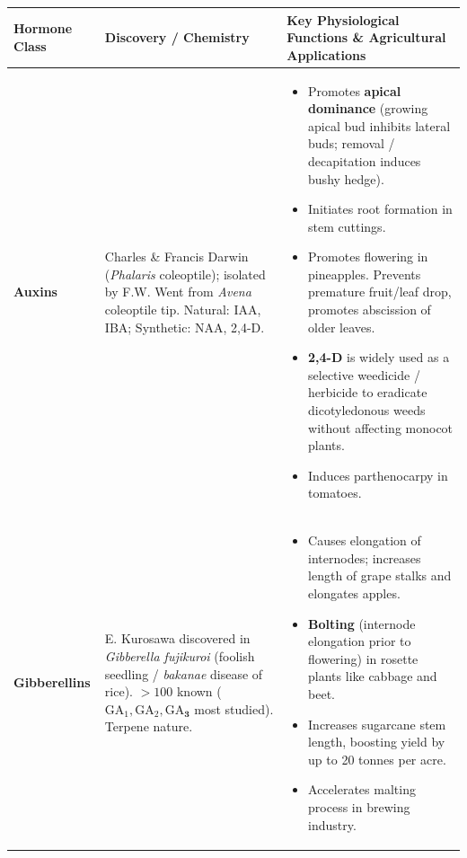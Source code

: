 \documentclass[10pt,a4paper]{article}
\begin{document}
\begin{conceptbox}
\begin{center}
\scriptsize
\begin{tabular}{|p{1.8cm}|p{2.6cm}|p{9.4cm}|}
\hline
\textbf{Hormone Class} & \textbf{Discovery / Chemistry} & \textbf{Key Physiological Functions \& Agricultural Applications} \\
\hline
\textbf{Auxins} & Charles \& Francis Darwin (\textit{Phalaris} coleoptile); isolated by F.W. Went from \textit{Avena} coleoptile tip. Natural: IAA, IBA; Synthetic: NAA, 2,4-D. & \begin{minipage}[t]{9.4cm}\begin{itemize}[leftmargin=*,nosep] \item Promotes \textbf{apical dominance} (growing apical bud inhibits lateral buds; removal / decapitation induces bushy hedge). \item Initiates root formation in stem cuttings. \item Promotes flowering in pineapples. Prevents premature fruit/leaf drop, promotes abscission of older leaves. \item \textbf{2,4-D} is widely used as a selective weedicide / herbicide to eradicate dicotyledonous weeds without affecting monocot plants. \item Induces parthenocarpy in tomatoes. \end{itemize}\end{minipage} \\
\hline
\textbf{Gibberellins} & E. Kurosawa discovered in \textit{Gibberella fujikuroi} (foolish seedling / \textit{bakanae} disease of rice). $>100$ known ($\mathrm{GA}_1, \mathrm{GA}_2, \mathbf{\mathrm{GA}_3}$ most studied). Terpene nature. & \begin{minipage}[t]{9.4cm}\begin{itemize}[leftmargin=*,nosep] \item Causes elongation of internodes; increases length of grape stalks and elongates apples. \item \textbf{Bolting} (internode elongation prior to flowering) in rosette plants like cabbage and beet. \item Increases sugarcane stem length, boosting yield by up to 20 tonnes per acre. \item Accelerates malting process in brewing industry. \end{itemize}\end{minipage} \\

\end{tabular}
\end{center}
\end{conceptbox}
\end{document}
